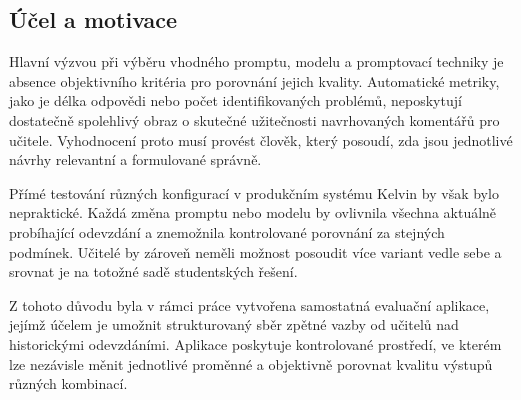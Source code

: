 \subsection{Účel a motivace}
\label{subsec:implementation-tool-purpose}

Hlavní výzvou při výběru vhodného promptu, modelu a promptovací techniky je absence objektivního kritéria pro porovnání jejich kvality.
Automatické metriky, jako je délka odpovědi nebo počet identifikovaných problémů, neposkytují dostatečně spolehlivý obraz o skutečné užitečnosti navrhovaných komentářů pro učitele.
Vyhodnocení proto musí provést člověk, který posoudí, zda jsou jednotlivé návrhy relevantní a formulované správně.

Přímé testování různých konfigurací v produkčním systému Kelvin by však bylo nepraktické.
Každá změna promptu nebo modelu by ovlivnila všechna aktuálně probíhající odevzdání a znemožnila kontrolované porovnání za stejných podmínek.
Učitelé by zároveň neměli možnost posoudit více variant vedle sebe a srovnat je na totožné sadě studentských řešení.

Z tohoto důvodu byla v rámci práce vytvořena samostatná evaluační aplikace, jejímž účelem je umožnit strukturovaný sběr zpětné vazby od učitelů nad historickými odevzdáními.
Aplikace poskytuje kontrolované prostředí, ve kterém lze nezávisle měnit jednotlivé proměnné a objektivně porovnat kvalitu výstupů různých kombinací.

\endinput